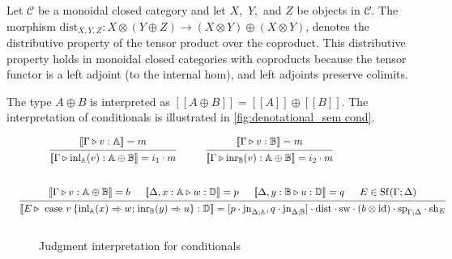 \documentclass[10pt,a4paper]{amsart}
\theoremstyle{definition}
\theoremstyle{definition}
\theoremstyle{definition}
\theoremstyle{definition}
\theoremstyle{definition}
\theoremstyle{definition}
\begin{document}
 Let $\mathcal{C}$ be a monoidal closed category and let $X,$ $Y,$ and $Z$ be objects in $\mathcal{C}$. The morphism $\text{dist}_{X, Y,Z}: X \otimes  \left(Y \oplus Z\right) \xrightarrow{} \left(X \otimes Y\right) \oplus \left(X \otimes Y\right)$, denotes the distributive property of the tensor product over the coproduct.  This distributive property holds in monoidal closed categories with coproducts because the tensor functor is a left adjoint (to the internal hom), and left adjoints preserve colimits.

The type $A \oplus B$ is interpreted as $[\![A \oplus B ]\!] = [\![A ]\!] \oplus [\![ B ]\!]$. The interpretation of conditionals is illustrated in \autoref{fig:denotational_sem cond}.

\begin{figure}[H]
  \begin{equation*}
  \begin{aligned}
  &\hspace{10pt}
  \begin{prooftree}
      \hypo{ [\![\Gamma \triangleright v: \mathbb{A}]\!] = m }
      \infer1[]{ [\![ \Gamma \triangleright \text{inl}_{\mathbb{A}} (v):  \mathbb{A} \oplus \mathbb{B}  ]\!] = i_{1}  \cdot m}
  \end{prooftree}
  \hspace{30pt}
  \begin{prooftree}
    \hypo{ [\![\Gamma \triangleright v: \mathbb{B}]\!] = m }
    \infer1[]{ [\![ \Gamma \triangleright \text{inr}_{\mathbb{B}} (v):  \mathbb{A} \oplus \mathbb{B}  ]\!] = i_2  \cdot m}
\end{prooftree}
  \\[20pt]
  &\hspace{-20pt}
  \begin{prooftree}
      \hypo{[\![\Gamma\triangleright v: \mathbb{A} \oplus \mathbb{B} ]\!] = b}
      \hypo{[\![\Delta, x:\mathbb{A} \triangleright w: \mathbb{D} ]\!] = p}
      \hypo{ [\![\Delta,y:\mathbb{B} \triangleright u: \mathbb{D} ]\!] = q }
      \hypo{E \in \Shuff(\Gamma; \Delta)}
      \infer4[]{ [\![E \triangleright \text{ case } v \hspace{2pt}  \{\text{inl}_{\mathbb{A}} (x) \Rightarrow w ; \hspace{1pt} \text{inr}_{\mathbb{B}} (y) \Rightarrow u\}: \mathbb{D} ]\!] =   [p \cdot \text{jn}_{\Delta;\mathbb{A}},q \cdot \text{jn}_{\Delta;\mathbb{B}}] \cdot \text{dist} \cdot \text{sw} \cdot (b \otimes \text{id}) \cdot \text{sp}_{\Gamma;\Delta} \cdot \text{sh}_{E}}
  \end{prooftree}
  \\[10pt]
  \end{aligned}
  \end{equation*}
  \caption{Judgment interpretation for conditionals}
\label{fig:denotational_sem cond}
\end{figure}







 

\end{document}
